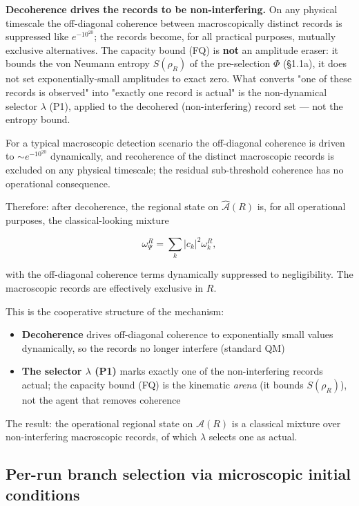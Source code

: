 \documentclass[11pt,a4paper]{article}
\begin{document}
\textbf{Decoherence drives the records to be non-interfering.} On any physical timescale the off-diagonal coherence between macroscopically distinct records is suppressed like $e^{-10^{20}}$; the records become, for all practical purposes, mutually exclusive alternatives. The capacity bound (FQ) is \textbf{not} an amplitude eraser: it bounds the von Neumann entropy $S(\rho_R)$ of the pre-selection $\Phi$ (§1.1a), it does not set exponentially-small amplitudes to exact zero. What converts "one of these records is observed" into "exactly one record is actual" is the non-dynamical selector $\lambda$ (P1), applied to the decohered (non-interfering) record set — not the entropy bound.

For a typical macroscopic detection scenario the off-diagonal coherence is driven to $\sim e^{-10^{20}}$ dynamically, and recoherence of the distinct macroscopic records is excluded on any physical timescale; the residual sub-threshold coherence has no operational consequence.

Therefore: after decoherence, the regional state on $\hat{\mathcal{A}}(R)$ is, for all operational purposes, the classical-looking mixture

\[
\omega_\Psi^{R} = \sum_k |c_k|^2 \omega_k^R,
\]

with the off-diagonal coherence terms dynamically suppressed to negligibility. The macroscopic records are effectively exclusive in $R$.

This is the cooperative structure of the mechanism:
\begin{itemize}
  \item \textbf{Decoherence} drives off-diagonal coherence to exponentially small values dynamically, so the records no longer interfere (standard QM)
  \item \textbf{The selector $\lambda$ (P1)} marks exactly one of the non-interfering records actual; the capacity bound (FQ) is the kinematic \emph{arena} (it bounds $S(\rho_R)$), not the agent that removes coherence
\end{itemize}

The result: the operational regional state on $\hat{\mathcal{A}}(R)$ is a classical mixture over non-interfering macroscopic records, of which $\lambda$ selects one as actual.

\subsection{Per-run branch selection via microscopic initial conditions}
\end{document}
